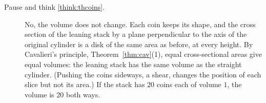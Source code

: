 \documentclass[11pt]{article}
\begin{document}
\begin{description}
  \item[Pause and think \ref{think:thcoins}.] No, the volume does not change. Each coin keeps its shape, and the cross section of the leaning stack by a plane perpendicular to the axis of the original cylinder is a disk of the same area as before, at every height. By Cavalieri's principle, Theorem~\ref{thm:cav}(1), equal cross-sectional areas give equal volumes: the leaning stack has the same volume as the straight cylinder. (Pushing the coins sideways, a shear, changes the position of each slice but not its area.) If the stack has $20$ coins each of volume $1$, the volume is $20$ both ways.

\end{description}
\end{document}

